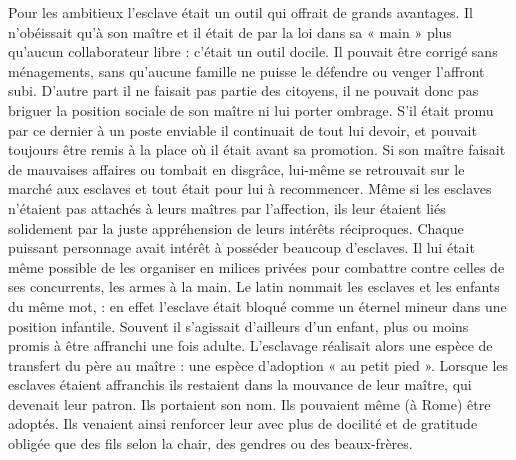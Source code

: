 Pour les ambitieux l'esclave était un outil qui offrait de grands
avantages. Il n'obéissait qu'à son maître et il était de par la loi dans sa «
main » plus qu'aucun collaborateur libre : c'était un outil docile. Il pouvait
être corrigé sans ménagements, sans qu'aucune famille ne puisse le
défendre ou venger l'affront subi. D'autre part il ne faisait pas partie des
citoyens, il ne pouvait donc pas briguer la position sociale de son maître
ni lui porter ombrage. S'il était promu par ce dernier à un poste enviable
il continuait de tout lui devoir, et pouvait toujours être remis à la place
où il était avant sa promotion. Si son maître faisait de mauvaises affaires
ou tombait en disgrâce, lui-même se retrouvait sur le marché aux esclaves
et tout était pour lui à recommencer. Même si les esclaves n'étaient
pas attachés à leurs maîtres par l'affection, ils leur étaient liés solidement
par la juste appréhension de leurs intérêts réciproques. Chaque puissant
personnage avait intérêt à posséder beaucoup d'esclaves. Il lui était même
possible de les organiser en milices privées pour combattre contre celles
de ses concurrents, les armes à la main. Le latin nommait les esclaves et
les enfants du même mot,  : en effet l'esclave était bloqué comme un
éternel mineur dans une position infantile. Souvent il s'agissait d'ailleurs
d'un enfant, plus ou moins promis à être affranchi une fois adulte. L'esclavage
réalisait alors une espèce de transfert du père au maître : une espèce
d'adoption « au petit pied ». Lorsque les esclaves étaient affranchis
ils restaient dans la mouvance de leur maître, qui devenait leur patron. Ils
portaient son nom. Ils pouvaient même (à Rome) être adoptés. Ils venaient
ainsi renforcer leur  avec plus de docilité et de gratitude
obligée que des fils selon la chair, des gendres ou des beaux-frères.

